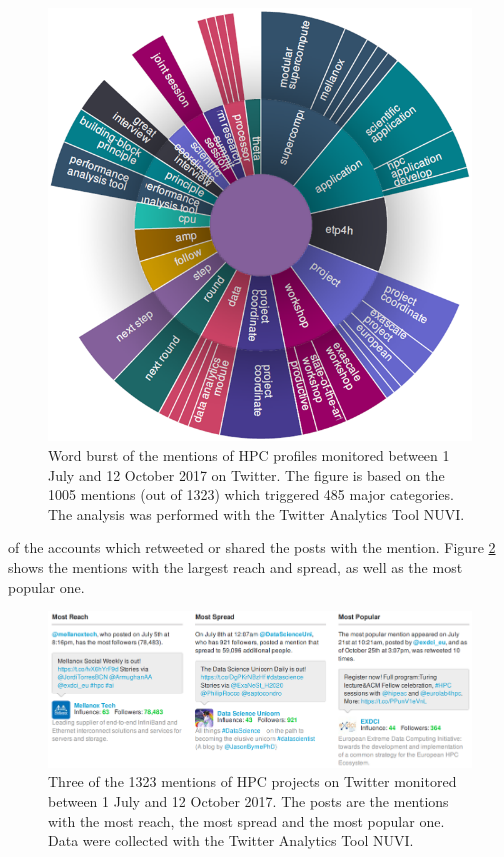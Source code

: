 \begin{figure}[H] 
 \begin{center}
 \includegraphics[scale=0.57]{Images/HPC_word_burst.png}
 \caption{Word burst of the mentions of HPC profiles monitored between 1 July and 12 October 2017 on Twitter. The figure is based on the 1005 mentions (out of 1323) which triggered 485 major categories. The analysis was performed with the Twitter Analytics Tool NUVI.}
 \label{HPC_word_burst}
 \end{center}
\end{figure}

\noindent
of the accounts which retweeted or shared the posts with the mention. Figure \ref{HPC_Most_reach_spread_popular} shows the mentions with the largest reach and spread, as well as the most popular one. 

\begin{figure}[!t] 
 \begin{center}
 \includegraphics[scale=0.41]{Images/HPC_Most_reach_spread_popular.png}
 \caption{Three of the 1323 mentions of HPC projects on Twitter monitored between 1 July and 12 October 2017. The posts are the mentions with the most reach, the most spread and the most popular one. Data were collected with the Twitter Analytics Tool NUVI.}
 \label{HPC_Most_reach_spread_popular}
 \end{center}
\end{figure}

